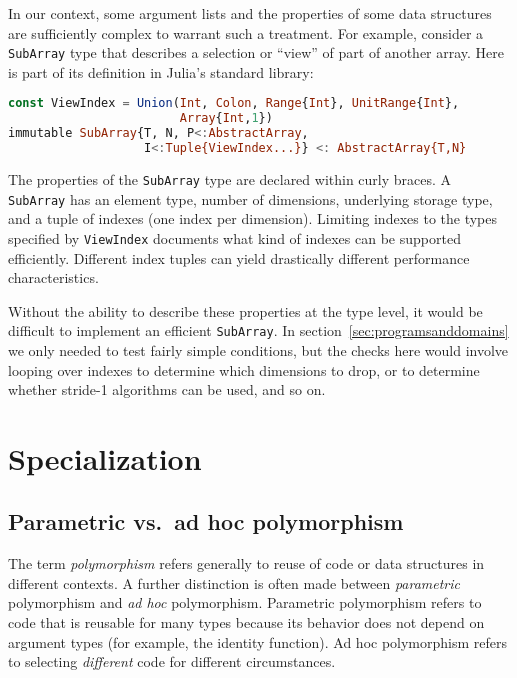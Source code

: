 In our context, some argument lists and the properties of some data
structures are sufficiently complex to warrant such a treatment.
For example, consider a \texttt{SubArray} type that describes a
selection or ``view'' of part of another array.
Here is part of its definition in Julia's standard library:

\begin{singlespace}
\begin{lstlisting}[language=julia]
const ViewIndex = Union(Int, Colon, Range{Int}, UnitRange{Int},
                        Array{Int,1})
immutable SubArray{T, N, P<:AbstractArray,
                   I<:Tuple{ViewIndex...}} <: AbstractArray{T,N}
\end{lstlisting}
\end{singlespace}

\noindent
The properties of the \texttt{SubArray} type are declared within curly
braces.
A \texttt{SubArray} has an element type, number of dimensions,
underlying storage type, and a tuple of indexes (one index per dimension).
Limiting indexes to the types specified by \texttt{ViewIndex}
documents what kind of indexes can be supported efficiently.
Different index tuples can yield drastically different performance
characteristics.

Without the ability to describe these properties at the type level,
it would be difficult to implement an efficient \texttt{SubArray}.
In section~\ref{sec:programsanddomains} we only needed to test fairly
simple conditions, but the checks here would involve looping over
indexes to determine which dimensions to drop, or to determine whether
stride-1 algorithms can be used, and so on.



\section{Specialization}

\subsection{Parametric vs.\ ad hoc polymorphism}

The term \emph{polymorphism} refers generally to reuse of code or data
structures in different contexts.
A further distinction is often made between \emph{parametric} polymorphism
and \emph{ad hoc} polymorphism.
Parametric polymorphism refers to code that is reusable for many types
because its behavior does not depend on argument types (for example,
the identity function).
Ad hoc polymorphism refers to selecting
\emph{different} code for different circumstances.

